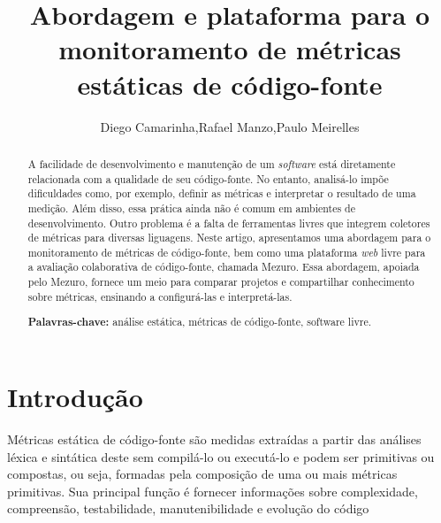 \documentclass{llncs}
\begin{document}
\sloppy
\title{Abordagem e plataforma para o monitoramento de métricas estáticas de código-fonte}

\author{Diego Camarinha,Rafael Manzo,Paulo Meirelles}


\maketitle


\begin{abstract}

A facilidade de desenvolvimento e manutenção de um \textit{software} está
diretamente relacionada com a qualidade de seu código-fonte.
No entanto, analisá-lo impõe dificuldades como, por exemplo, definir as
métricas e interpretar o resultado de uma medição. Além disso, essa prática
ainda não é comum em ambientes de desenvolvimento. Outro problema é a falta de
ferramentas livres que integrem coletores de métricas para diversas liguagens.
Neste artigo, apresentamos uma abordagem para o monitoramento de métricas de
código-fonte, bem como uma plataforma \textit{web} livre para a avaliação
colaborativa de código-fonte, chamada Mezuro. Essa abordagem, apoiada pelo
Mezuro, fornece um meio para comparar projetos e compartilhar conhecimento
sobre métricas, ensinando a configurá-las e interpretá-las.

\textbf{Palavras-chave:} análise estática, métricas de código-fonte, software
livre.

\end{abstract}


\section{Introdução}
\label{sec:intro}

Métricas estática de código-fonte são medidas extraídas a partir das análises
léxica e sintática deste sem compilá-lo ou executá-lo e podem ser primitivas ou
compostas, ou seja, formadas pela composição de uma ou mais métricas
primitivas. Sua principal função é fornecer informações sobre complexidade,
compreensão, testabilidade, manutenibilidade e evolução do
código~\cite{Henderson-Sellers96,Sato07}
\end{document}
